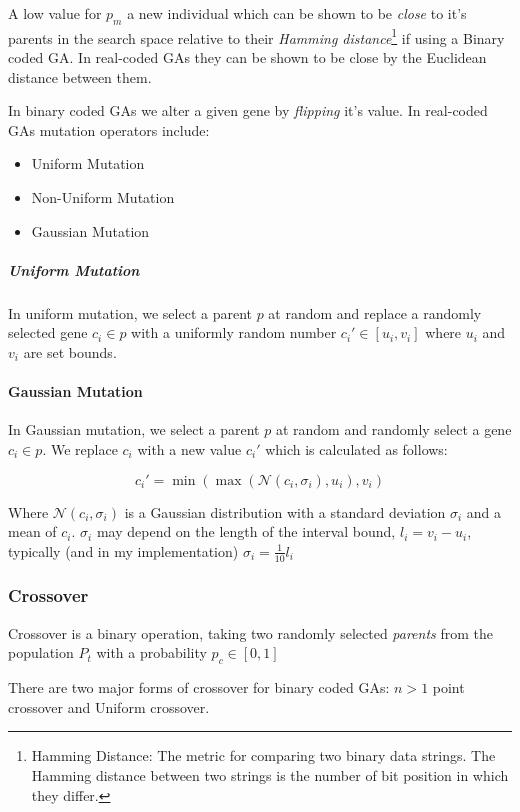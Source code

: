 A low value for $p_m$ a new individual which can be shown to be \textit{close} to it's parents in the search space relative to their \textit{Hamming distance}\footnote{Hamming Distance: The metric for comparing two binary data strings. The Hamming distance between two strings is the number of bit position in which they differ.} if using a Binary coded GA. In real-coded GAs they can be shown to be close by the Euclidean distance between them.

In binary coded GAs we alter a given gene by \textit{flipping} it's value.
In real-coded GAs mutation operators include: 
\begin{itemize}
    \item Uniform Mutation
    \item Non-Uniform Mutation
    \item Gaussian Mutation 
\end{itemize}
\subparagraph{Uniform Mutation}
In uniform mutation, we select a parent $p$ at random and replace a randomly selected gene $c_i \in p$ with a uniformly random number $c_i' \in [u_i,v_i]$  where $u_i$ and $v_i$ are set bounds.

\paragraph{Gaussian Mutation}

In Gaussian mutation, we select a parent $p$ at random and randomly select a gene $c_{i} \in p$. We replace $c_{i}$ with a new value $c_{i}'$ which is calculated as follows:

\begin{equation}
  c_{i}' = \min(\max(\mathcal{N}(c_{i},\sigma_{i}), u_{i}), v_{i})
\end{equation}

Where $\mathcal{N}(c_{i},\sigma_{i})$ is a Gaussian distribution with a standard deviation \(\sigma_{i}\) and a mean of $c_{i}$. \(\sigma_{i}\) may depend on the length of the interval bound, $l_{i} = v_{i} - u_{i}$, typically (and in my implementation) $\sigma_{i} = \frac{1}{10}l_{i}$


\subsubsection{Crossover}

Crossover is a binary operation, taking two randomly selected \textit{parents} from the population $P_t$ with a probability $p_c \in [0,1]$ 

There are two major forms of crossover for binary coded GAs: $n>1$ point crossover and Uniform crossover. 

